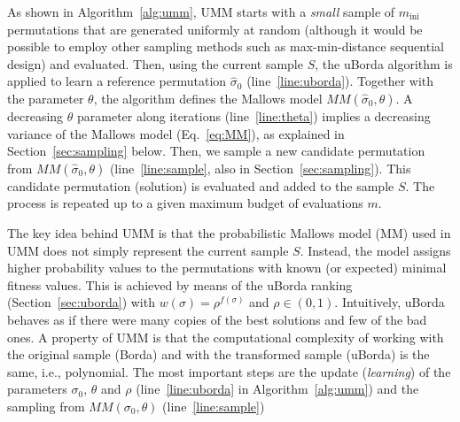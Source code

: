 \documentclass[sigconf,dvipsnames]{acmart}
\newcommand{\minit}{\ensuremath{m_\text{ini}}\xspace}
\newcommand{\FEmax}{\ensuremath{m}}
\begin{document}
As shown in Algorithm~\ref{alg:umm}, UMM  starts with a \emph{small} sample of $\minit$ permutations that are generated uniformly at random  (although it would be possible to employ other sampling methods such as max-min-distance sequential design) and evaluated. Then, using the current sample $S$, the uBorda algorithm is applied to learn a reference permutation $\hat{\sigma}_0$ (line~\ref{line:uborda}). 
Together with the parameter $\theta$, the algorithm defines the Mallows model $MM(\hat\sigma_0, \theta)$. 
A decreasing $\theta$ parameter along iterations (line~\ref{line:theta}) implies a decreasing variance of the Mallows model (Eq.~\ref{eq:MM}), as explained in  Section~\ref{sec:sampling} below. 
Then, we sample a new candidate permutation from  $MM(\hat\sigma_0, \theta)$ (line~\ref{line:sample}, also  in  Section~\ref{sec:sampling}). This candidate permutation (solution) is evaluated and added to the sample $S$. The process is repeated up to a given maximum budget of evaluations $\FEmax$.

The key idea behind UMM is that the probabilistic Mallows model (MM) used in
UMM does not simply represent the current sample $S$. Instead, the model
assigns higher probability values to the permutations with known (or expected)
minimal fitness values. This is achieved by means of the uBorda ranking
(Section~\ref{sec:uborda}) with $w(\sigma) = \rho^{f(\sigma)}$ and $\rho \in (0,1)$. %
Intuitively, uBorda behaves as if there were many copies of the best
solutions and few of the bad ones. A property of UMM is that the
computational complexity of working with the original sample (Borda) and with the
transformed sample (uBorda) is the same, i.e., polynomial. The most important steps are the update
(\emph{learning}) of the parameters $\sigma_0$, $\theta$ and $\rho$ (line~\ref{line:uborda} in Algorithm~\ref{alg:umm}) and
the sampling from $MM(\sigma_0,\theta)$ (line~\ref{line:sample}) %
\end{document}
